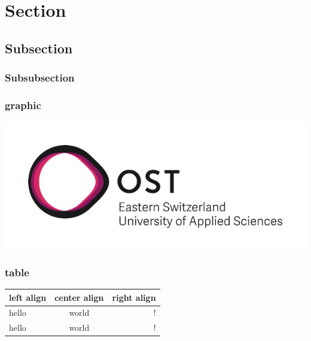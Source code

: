 

\section{Section}



\subsection{Subsection}


\subsubsection{Subsubsection}
\lipsum

\subsubsection{graphic}
\begin{center}
    \includegraphics[width=\linewidth]{./img/OST_Logo.png}
\end{center}
\vspace{-8pt}

\subsubsection{table}
    \begin{center}
    \begin{tabular}{l | c | r}
        \hline
        left align & center align & right align\\ \hline
        \hline
        hello & world & !\\ \hline
        hello & world & !\\ \hline
    \end{tabular}
    \end{center}

